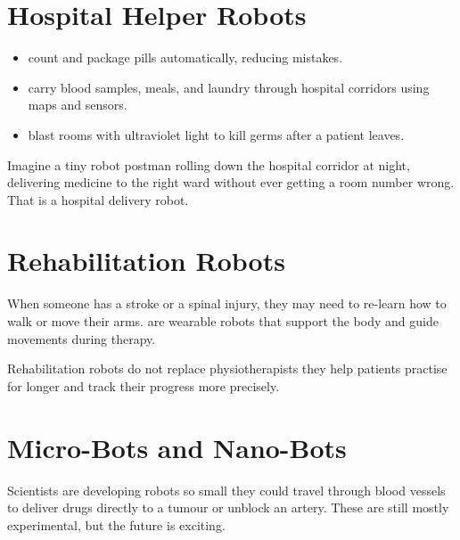 \sectionrule

\section*{Hospital Helper Robots}

\begin{itemize}
  \item \textbf{} count and package pills automatically,
    reducing mistakes.
  \item \textbf{} carry blood samples, meals, and laundry
    through hospital corridors using maps and sensors.
  \item \textbf{} blast rooms with ultraviolet light
    to kill germs after a patient leaves.
\end{itemize}

\begin{picturethis}
  Imagine a tiny robot postman rolling down the hospital corridor at night,
  delivering medicine to the right ward without ever getting a room number
  wrong. That is a hospital delivery robot.
\end{picturethis}

\sectionrule

\section*{Rehabilitation Robots}

When someone has a stroke or a spinal injury, they may need to re-learn
how to walk or move their arms.  are wearable robots
that support the body and guide movements during therapy.

\begin{bigidea}
  Rehabilitation robots do not replace physiotherapists \textemdash{}
  they help patients practise for longer and track their progress
  more precisely.
\end{bigidea}

\sectionrule

\section*{Micro-Bots and Nano-Bots}

Scientists are developing robots so small they could travel through
blood vessels to deliver drugs directly to a tumour or unblock an artery.
These are still mostly experimental, but the future is exciting.

